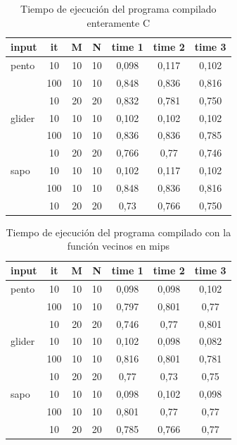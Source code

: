 \documentclass[11pt,a4paper]{article}
\begin{document}
\begin{table}[h]
	\centering
	\begin{tabular}{|l|c|c|c|c|c|c|}
		\hline
		\textbf{input}&\textbf{it}&\textbf{M}&\textbf{N} &\textbf{time 1}&\textbf{time 2}&\textbf{time 3}\\
		\hline
		pento &	10	&10	&10	&0,098	&0,117	&0,102\\
		      & 100	&10	&10	&0,848	&0,836	&0,816\\
		      & 10	&20	&20	&0,832	&0,781	&0,750\\
		\hline
		glider& 10	&10	&10	&0,102	&0,102	&0,102\\
		      & 100	&10	&10	&0,836	&0,836	&0,785\\
		      & 10	&20	&20	&0,766	&0,77	&0,746\\
		\hline
		sapo  &	10	&10	&10	&0,102	&0,117	&0,102\\
		      & 100	&10	&10	&0,848	&0,836	&0,816\\
		      & 10	&20	&20	&0,73	&0,766	&0,750\\
		\hline
	\end{tabular}
	\caption{Tiempo de ejecución del programa compilado enteramente C}
	\label{tab:t_c}
\end{table}

\begin{table}[h]
	\centering
	\begin{tabular}{|l|c|c|c|c|c|c|}
		\hline
		\textbf{input}&\textbf{it}&\textbf{M}&\textbf{N} &\textbf{time 1}&\textbf{time 2}&\textbf{time 3}\\
		\hline
		pento	&10	 &10	&10 &0,098	&0,098	&0,102\\
				&100 &10	&10 &0,797	&0,801	&0,77\\
				&10	 &20	&20 &0,746	&0,77	&0,801\\
				\hline
		glider	&10	 &10	&10 &0,102	&0,098	&0,082\\
				&100 &10	&10	&0,816	&0,801	&0,781\\
				&10	 &20	&20	&0,77	&0,73	&0,75\\
				\hline
		sapo	&10	 &10	&10	&0,098	&0,102	&0,098\\
				&100 &10	&10	&0,801	&0,77	&0,77\\
				&10	 &20	&20	&0,785	&0,766	&0,77\\
		\hline
	\end{tabular}
	\caption{Tiempo de ejecución del programa compilado con la función vecinos en mips}
	\label{tab:t_mips}
\end{table}
\end{document}
